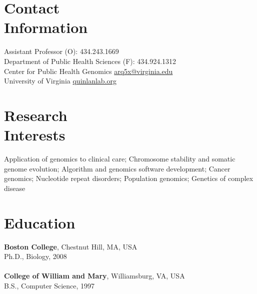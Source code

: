 \documentclass[margin,line]{cv}
\begin{document}
\begin{resume}
    \section{\mysidestyle Contact\\Information}
    Assistant Professor                                                                     \hfill (O): 434.243.1669\\%
    Department of Public Health Sciences                                                    \hfill (F): 434.924.1312\\%
    Center for Public Health Genomics                                                \hfill \url{arq5x@virginia.edu}\\%
    University of Virginia                                                    \hfill \url{quinlanlab.org}\\%

    \section{\mysidestyle Research\\Interests}

    Application of genomics to clinical care; Chromosome stability and somatic genome evolution; Algorithm and genomics software development; Cancer genomics;
    Nucleotide repeat disorders; Population genomics; Genetics of complex disease 

    \section{\mysidestyle Education}

    \textbf{Boston College}, Chestnut Hill, MA, USA\\
    Ph.D., Biology, 2008\\
    \\
    \textbf{College of William and Mary}, Williamsburg, VA, USA\\
    B.S., Computer Science, 1997



\end{resume}
\end{document}
